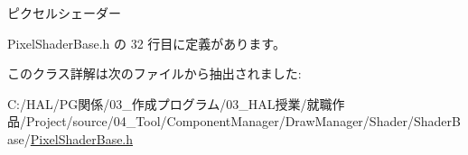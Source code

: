 ピクセルシェーダー 



 Pixel\+Shader\+Base.\+h の 32 行目に定義があります。



このクラス詳解は次のファイルから抽出されました\+:\begin{DoxyCompactItemize}
\item 
C\+:/\+H\+A\+L/\+P\+G関係/03\+\_\+作成プログラム/03\+\_\+\+H\+A\+L授業/就職作品/\+Project/source/04\+\_\+\+Tool/\+Component\+Manager/\+Draw\+Manager/\+Shader/\+Shader\+Base/\mbox{\hyperlink{_pixel_shader_base_8h}{Pixel\+Shader\+Base.\+h}}\end{DoxyCompactItemize}
